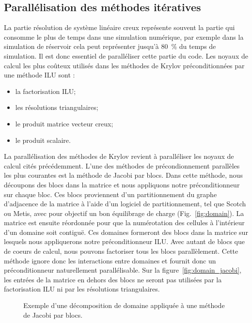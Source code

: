\subsection{Parallélisation des méthodes itératives}
La partie résolution de système linéaire creux représente souvent la partie qui consomme le plus de temps dans une simulation numérique, par exemple dans la simulation de réservoir cela peut représenter jusqu'à 80~\% du temps de simulation.
%
Il est donc essentiel de paralléliser cette partie du code.
%
Les noyaux de calcul les plus coûteux utilisés dans les méthodes de Krylov préconditionnées par une méthode ILU sont :
\begin{itemize}
  \item la factorisation ILU;
  \item les résolutions triangulaires;
  \item le produit matrice vecteur creux;
  \item le produit scalaire.
\end{itemize}


La parallélisation des méthodes de Krylov revient à paralléliser les noyaux de calcul cités précédemment.
%
L'une des méthodes de précondionnement parallèles les plus courantes est la méthode de Jacobi par blocs.
%
Dans cette méthode, nous découpons des blocs dans la matrice et nous appliquons notre préconditionneur sur chaque bloc.
%
Ces blocs proviennent d'un partitionnement du graphe d'adjacence de la matrice à l'aide d'un logiciel de partitionnement, tel que Scotch\cite{scotch} ou Metis\cite{metis}, avec pour objectif un bon équilibrage de charge (Fig.~\ref{fig:domain}).
%
La matrice est ensuite réordonnée pour que la numérotation des cellules à l'intérieur d'un domaine soit contiguë.
%
Ces domaines formeront des blocs dans la matrice sur lesquels nous appliquerons notre préconditionneur ILU.
%
Avec autant de blocs que de coeurs de calcul, nous pouvons factoriser tous les blocs parallèlement.
%
Cette méthode ignore donc les interactions entre domaines et fournit donc un préconditionneur naturellement parallélisable.
%
Sur la figure~\ref{fig:domain_jacobi}, les entrées de la matrice en dehors des blocs ne seront pas utilisées par la factorisation ILU ni par les résolutions triangulaires.
\begin{figure}[!h]
     \begin{center}
    \end{center}
    \caption{Exemple d'une décomposition de domaine appliquée à une méthode de Jacobi par blocs.}
    \label{fig:jacobi}
\end{figure}



